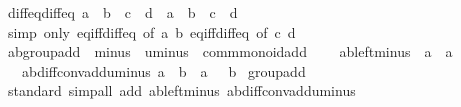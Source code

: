 \begin{isabellebody}
%
\endisadelimproof
\isanewline
{}\isamarkupfalse%
\ diff{\isacharunderscore}{\kern0pt}eq{\isacharunderscore}{\kern0pt}diff{\isacharunderscore}{\kern0pt}eq{\isacharcolon}{\kern0pt}\ {\isachardoublequoteopen}a\ {\isacharminus}{\kern0pt}\ b\ {\isacharequal}{\kern0pt}\ c\ {\isacharminus}{\kern0pt}\ d\ {\isasymLongrightarrow}\ a\ {\isacharequal}{\kern0pt}\ b\ {\isasymlongleftrightarrow}\ c\ {\isacharequal}{\kern0pt}\ d{\isachardoublequoteclose}\isanewline
%
\isadelimproof
\ \ %
\endisadelimproof
%
\isatagproof
{}\isamarkupfalse%
\ {\isacharparenleft}{\kern0pt}simp\ only{\isacharcolon}{\kern0pt}\ eq{\isacharunderscore}{\kern0pt}iff{\isacharunderscore}{\kern0pt}diff{\isacharunderscore}{\kern0pt}eq{\isacharunderscore}{\kern0pt}{}\ {\isacharbrackleft}{\kern0pt}of\ a\ b{\isacharbrackright}{\kern0pt}\ eq{\isacharunderscore}{\kern0pt}iff{\isacharunderscore}{\kern0pt}diff{\isacharunderscore}{\kern0pt}eq{\isacharunderscore}{\kern0pt}{}\ {\isacharbrackleft}{\kern0pt}of\ c\ d{\isacharbrackright}{\kern0pt}{\isacharparenright}{\kern0pt}%
\endisatagproof
{\isafoldproof}%
%
\isadelimproof
\isanewline
%
\endisadelimproof
\isanewline
{}\isamarkupfalse%
\isanewline
\isanewline
{}\isamarkupfalse%
\ ab{\isacharunderscore}{\kern0pt}group{\isacharunderscore}{\kern0pt}add\ {\isacharequal}{\kern0pt}\ minus\ {\isacharplus}{\kern0pt}\ uminus\ {\isacharplus}{\kern0pt}\ comm{\isacharunderscore}{\kern0pt}monoid{\isacharunderscore}{\kern0pt}add\ {\isacharplus}{\kern0pt}\isanewline
\ \ \ ab{\isacharunderscore}{\kern0pt}left{\isacharunderscore}{\kern0pt}minus{\isacharcolon}{\kern0pt}\ {\isachardoublequoteopen}{\isacharminus}{\kern0pt}\ a\ {\isacharplus}{\kern0pt}\ a\ {\isacharequal}{\kern0pt}\ {}{\isachardoublequoteclose}\isanewline
\ \ \ ab{\isacharunderscore}{\kern0pt}diff{\isacharunderscore}{\kern0pt}conv{\isacharunderscore}{\kern0pt}add{\isacharunderscore}{\kern0pt}uminus{\isacharcolon}{\kern0pt}\ {\isachardoublequoteopen}a\ {\isacharminus}{\kern0pt}\ b\ {\isacharequal}{\kern0pt}\ a\ {\isacharplus}{\kern0pt}\ {\isacharparenleft}{\kern0pt}{\isacharminus}{\kern0pt}\ b{\isacharparenright}{\kern0pt}{\isachardoublequoteclose}\isanewline
{}\isanewline
\isanewline
{}\isamarkupfalse%
\ group{\isacharunderscore}{\kern0pt}add\isanewline
%
\isadelimproof
\ \ %
\endisadelimproof
%
\isatagproof
{}\isamarkupfalse%
\ standard\ {\isacharparenleft}{\kern0pt}simp{\isacharunderscore}{\kern0pt}all\ add{\isacharcolon}{\kern0pt}\ ab{\isacharunderscore}{\kern0pt}left{\isacharunderscore}{\kern0pt}minus\ ab{\isacharunderscore}{\kern0pt}diff{\isacharunderscore}{\kern0pt}conv{\isacharunderscore}{\kern0pt}add{\isacharunderscore}{\kern0pt}uminus{\isacharparenright}{\kern0pt}%

\end{isabellebody}
